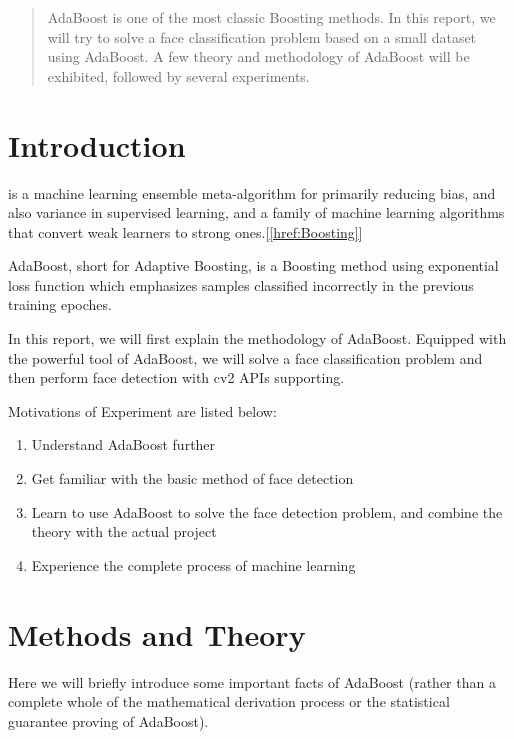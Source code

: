 \documentclass[journal, a4paper]{IEEEtran}
\begin{document}
\begin{abstract}
\begin{bfseries}
AdaBoost is one of the most classic Boosting methods. In this report, we will try to solve a face classification problem based on a small dataset using AdaBoost. A few theory and methodology of AdaBoost will be exhibited, followed by several experiments.  
\end{bfseries}
\end{abstract}

\section{Introduction}
 is a machine learning ensemble meta-algorithm for primarily reducing bias, and also variance in supervised learning, and a family of machine learning algorithms that convert weak learners to strong ones.[\ref{href:Boosting}]

AdaBoost, short for Adaptive Boosting, is a Boosting method using exponential loss function which emphasizes samples classified incorrectly in the previous training epoches. 

In this report, we will first explain the methodology of AdaBoost.
Equipped with the powerful tool of AdaBoost, we will solve a face classification problem and then perform face detection with cv2 APIs supporting.  

Motivations of Experiment are listed below:
    \begin{enumerate}
      \item Understand AdaBoost further
      \item Get familiar with the basic method of face detection
      \item Learn to use AdaBoost to solve the face detection problem, and combine the theory with the actual project
      \item Experience the complete process of machine learning   
    \end{enumerate}

\section{Methods and Theory}
Here we will briefly introduce some important facts of AdaBoost (rather than a complete whole of the mathematical derivation process or the statistical guarantee proving of AdaBoost).
\end{document}
